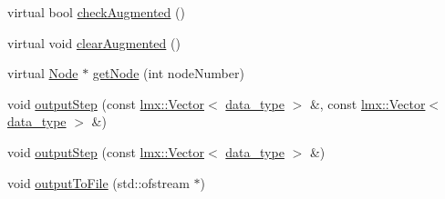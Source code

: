 \begin{DoxyCompactItemize}
virtual bool \hyperlink{classmknix_1_1_constraint_a26923b449734b9f11ed5ca2556585dcb}{check\+Augmented} ()
\item 
virtual void \hyperlink{classmknix_1_1_constraint_a2e1f0de7e983151fb892468774dcdf12}{clear\+Augmented} ()
\item 
virtual \hyperlink{classmknix_1_1_node}{Node} $\ast$ \hyperlink{classmknix_1_1_constraint_a0e81d924dad26b7b5b0749d4580dd63c}{get\+Node} (int node\+Number)
\item 
void \hyperlink{classmknix_1_1_constraint_a51d31cadb80963fac74eca26487a4f39}{output\+Step} (const \hyperlink{classlmx_1_1_vector}{lmx\+::\+Vector}$<$ \hyperlink{namespacemknix_a16be4b246fbf2cceb141e3a179111020}{data\+\_\+type} $>$ \&, const \hyperlink{classlmx_1_1_vector}{lmx\+::\+Vector}$<$ \hyperlink{namespacemknix_a16be4b246fbf2cceb141e3a179111020}{data\+\_\+type} $>$ \&)
\item 
void \hyperlink{classmknix_1_1_constraint_a72947f21c4d519a9da8877e45a453212}{output\+Step} (const \hyperlink{classlmx_1_1_vector}{lmx\+::\+Vector}$<$ \hyperlink{namespacemknix_a16be4b246fbf2cceb141e3a179111020}{data\+\_\+type} $>$ \&)
\item 
void \hyperlink{classmknix_1_1_constraint_afca864e3f350bdd6647084a52057dc47}{output\+To\+File} (std\+::ofstream $\ast$)
\end{DoxyCompactItemize}
